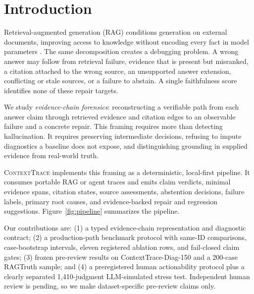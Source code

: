 \section{Introduction}
Retrieval-augmented generation (RAG) conditions generation on external
documents, improving access to knowledge without encoding every fact in model
parameters \citep{lewis2020rag}. The same decomposition creates a debugging
problem. A wrong answer may follow from retrieval failure, evidence that is
present but misranked, a citation attached to the wrong source, an unsupported
answer extension, conflicting or stale sources, or a failure to abstain. A
single faithfulness score identifies none of these repair targets.

We study \emph{evidence-chain forensics}: reconstructing a verifiable path from
each answer claim through retrieved evidence and citation edges to an observable
failure and a concrete repair. This framing requires more than detecting
hallucination. It requires preserving intermediate decisions, refusing to
impute diagnostics a baseline does not expose, and distinguishing grounding in
supplied evidence from real-world truth.

\textsc{ContextTrace} implements this framing as a deterministic, local-first
pipeline. It consumes portable RAG or agent traces and emits claim verdicts,
minimal evidence spans, citation states, source assessments, abstention
decisions, failure labels, primary root causes, and evidence-backed repair and
regression suggestions. Figure~\ref{fig:pipeline} summarizes the pipeline.

Our contributions are: (1) a typed evidence-chain representation and diagnostic
contract; (2) a production-path benchmark protocol with same-ID comparisons,
case-bootstrap intervals, eleven registered ablation rows, and fail-closed claim
gates; (3) frozen pre-review results on ContextTrace-Diag-150 and a 200-case
RAGTruth sample; and (4) a preregistered human actionability protocol plus a
clearly separated 1,410-judgment LLM-simulated stress test. Independent human
review is pending, so we make dataset-specific pre-review claims only.

